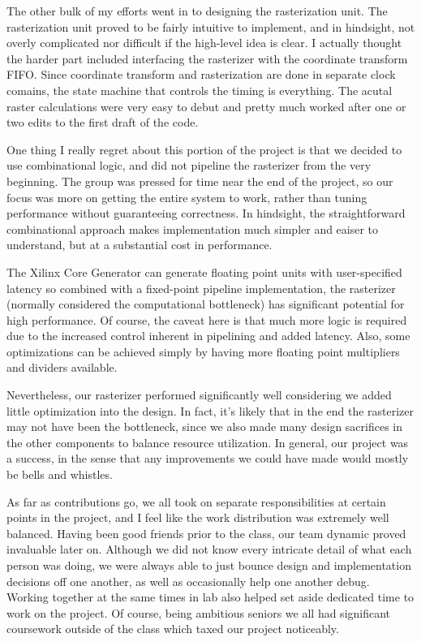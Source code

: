 \documentclass[letterpaper,10pt]{article}
\begin{document}
The other bulk of my efforts went in to designing the rasterization unit. The rasterization unit proved to be fairly intuitive to implement, and in hindsight, not overly complicated nor difficult if the high-level idea is clear. I actually thought the harder part included interfacing the rasterizer with the coordinate transform FIFO. Since coordinate transform and rasterization are done in separate clock comains, the state machine that controls the timing is everything. The acutal raster calculations were very easy to debut and pretty much worked after one or two edits to the first draft of the code. 

One thing I really regret about this portion of the project is that we decided to use combinational logic, and did not pipeline the rasterizer from the very beginning. The group was pressed for time near the end of the project, so our focus was more on getting the entire system to work, rather than tuning performance without guaranteeing correctness. In hindsight, the straightforward combinational approach makes implementation much simpler and eaiser to understand, but at a substantial cost in performance.  

The Xilinx Core Generator can generate floating point units with user-specified latency so combined with a fixed-point pipeline implementation, the rasterizer (normally considered the computational bottleneck) has significant potential for high performance. Of course, the caveat here is that much more logic is required due to the increased control inherent in pipelining and added latency. Also, some optimizations can be achieved simply by having more floating point multipliers and dividers available.

Nevertheless, our rasterizer performed significantly well considering we added little optimization into the design. In fact, it's likely that in the end the rasterizer may not have been the bottleneck, since we also made many design sacrifices in the other components to balance resource utilization. In general, our project was a success, in the sense that any improvements we could have made would mostly be bells and whistles. 

As far as contributions go, we all took on separate responsibilities at certain points in the project, and I feel like the work distribution was extremely well balanced. Having been good friends prior to the class, our team dynamic proved invaluable later on. Although we did not know every intricate detail of what each person was doing, we were always able to just bounce design and implementation decisions off one another, as well as occasionally help one another debug. Working together at the same times in lab also helped set aside dedicated time to work on the project. Of course, being ambitious seniors we all had significant coursework outside of the class which taxed our project noticeably.
\end{document}

